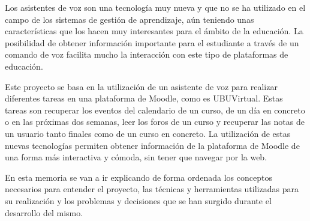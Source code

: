 
Los asistentes de voz son una tecnología muy nueva y que no se ha utilizado en el campo de los sistemas de gestión de aprendizaje, aún teniendo unas características que los hacen muy interesantes para el ámbito de la educación. La posibilidad de obtener información importante para el estudiante a través de un comando de voz facilita mucho la interacción con este tipo de plataformas de educación.

Este proyecto se basa en la utilización de un asistente de voz para realizar diferentes tareas en una plataforma de Moodle, como es  UBUVirtual. Estas tareas son recuperar los eventos del calendario de un curso, de un día en concreto o en las próximas dos semanas, leer los foros de un curso y recuperar las notas de un usuario tanto finales como de un curso en concreto. La utilización de estas nuevas tecnologías permiten obtener información de la plataforma de Moodle de una forma más interactiva y cómoda, sin tener que navegar por la web.

En esta memoria se van a ir explicando de forma ordenada los conceptos necesarios para entender el proyecto, las técnicas y herramientas utilizadas para su realización y los problemas y decisiones que se han surgido durante el desarrollo del mismo.